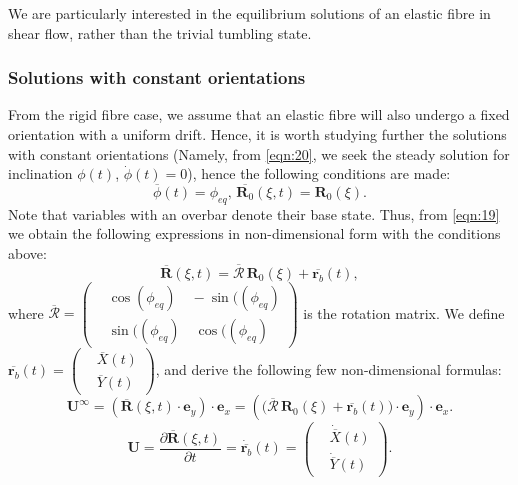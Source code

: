 \documentclass[lineno]{JFM-FLM_Au}
\begin{document}
We are particularly interested in the equilibrium solutions of an elastic fibre in shear flow, rather than the trivial tumbling state. 

\subsubsection{Solutions with constant orientations}
From the rigid fibre case, we assume that an elastic fibre will also undergo a fixed orientation with a uniform drift. Hence, it is worth studying further the solutions with constant orientations (Namely, from \eqref{eqn:20}, we seek the steady solution for inclination $\phi(t)$, $\dot{\phi}(t)=0$), hence the following conditions are made:
\begin{equation}
	\label{eqn:39}
	\overline{\phi}(t)=\phi_{eq},\, \overline{\mathbf{R}_0}(\xi,t)=\mathbf{R}_0(\xi).
\end{equation}
Note that variables with an overbar denote their base state. Thus, from \eqref{eqn:19} we obtain the following expressions in non-dimensional form with the conditions above:
\begin{equation}
	\label{eqn:40}
	\overline{\mathbf{R}}(\xi,t)=\overline{\mathbf{\mathcal{R}}}\,\mathbf{R}_0(\xi)+\overline{\mathbf{r}_b}(t),
\end{equation}
where $\overline{\mathbf{\mathcal{R}}}=\left(\begin{aligned}
	&\cos(\phi_{eq})\quad -\sin((\phi_{eq}) \\
	&\sin((\phi_{eq})\quad \cos((\phi_{eq})
\end{aligned}\right) $ is the rotation matrix. We define $\overline{\mathbf{r}_b}(t)=\left(\begin{aligned}
	&\overline{X}(t) \\
	&\overline{Y}(t)
\end{aligned}\right)$, and derive the following few non-dimensional formulas:
\begin{equation}
	\label{eqn:41}
	\mathbf{U}^{\infty}=\left(\overline{\mathbf{R}}(\xi,t)\cdot\mathbf{e}_y\right)\cdot\mathbf{e}_x=\left(\Big(\overline{\mathbf{\mathcal{R}}}\,\mathbf{R}_0(\xi)+\overline{\mathbf{r}_b}(t)\Big)\cdot\mathbf{e}_y\right)\cdot\mathbf{e}_x.
\end{equation}
\begin{equation}
	\label{eqn:42}
	\mathbf{U}=\frac{\partial\overline{\mathbf{R}}(\xi,t)}{\partial t}=\dot{\overline{\mathbf{r}_b}}(t)=\left(\begin{aligned}
		&\dot{\overline{X}}(t) \\
		&\dot{\overline{Y}}(t)
	\end{aligned}\right).
\end{equation}
\end{document}
